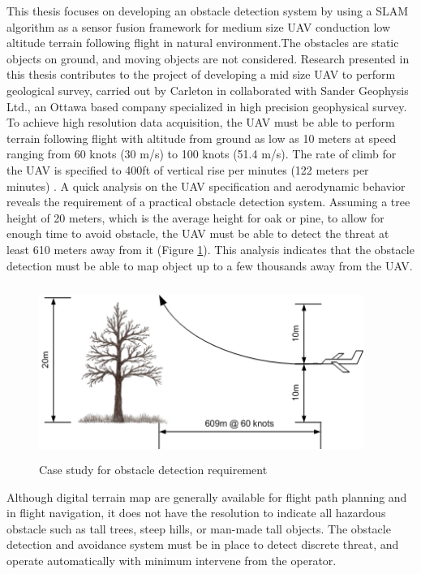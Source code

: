 This thesis focuses on developing an obstacle detection system by using
a SLAM algorithm as a sensor fusion framework for medium size UAV
conduction low altitude terrain following flight in natural
environment.The obstacles are static objects on ground, and moving
objects are not considered. Research presented in this thesis
contributes to the project of developing a mid size UAV to perform
geological survey, carried out by Carleton in collaborated with Sander
Geophysis Ltd., an Ottawa based company specialized in high precision
geophysical survey. To achieve high resolution data acquisition, the
UAV must be able to perform terrain following flight with altitude
from ground as low as 10 meters at speed ranging from 60 knots (30
m/s) to 100 knots (51.4 m/s). The rate of climb for the UAV is
specified to 400ft of vertical rise per minutes (122 meters per
minutes) \cite{james_geosurv_2008}. A quick analysis on the UAV specification and
aerodynamic behavior reveals the requirement of a practical obstacle
detection system. Assuming a tree height of 20 meters, which is the
average height for oak or pine, to allow for enough time to avoid
obstacle, the UAV must be able to detect the threat at least 610
meters away from it (Figure \ref{ob}). This analysis indicates that
the obstacle detection must be able to map object up to a few
thousands away from the UAV.

\begin{figure}[h]
\centering
\includegraphics[width=300pt,height=160pt]{./Figures/ProblemStatement.png}
\caption {Case study for obstacle detection requirement}
\label{ob}
\end{figure}

Although digital terrain map are generally available for flight path 
planning and in flight navigation, it does not have the resolution to 
indicate all hazardous obstacle such as tall trees, steep hills, or 
man-made tall objects. The obstacle detection and avoidance system must 
be in place to detect discrete threat, and operate automatically with 
minimum intervene from the operator. 

